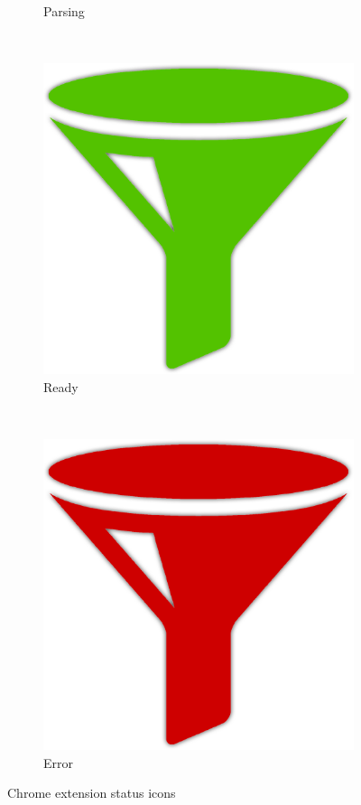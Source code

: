 \begin{figure}[H]
\begin{subfigure}[b]{\figureScale\textwidth}
\caption{Parsing}
\label{fig:chromeParsing}
\end{subfigure}~
\begin{subfigure}[b]{\figureScale\textwidth}
\centering
\includegraphics[scale=\innerScale]{Figures/greenPlain}
\caption{Ready}
\label{fig:chromeReady}
\end{subfigure}~
\begin{subfigure}[b]{\figureScale\textwidth}
\centering
\includegraphics[scale=\innerScale]{Figures/redPlain}
\caption{Error}
\label{fig:chromeError}
\end{subfigure}
\caption{Chrome extension status icons}\label{fig:icons}
\end{figure}

